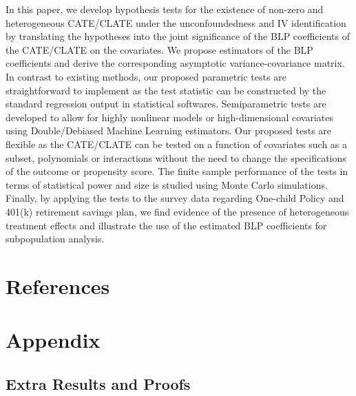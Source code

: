 \documentclass[
  12pt,
  12pt]{article}
\numberwithin{equation}{section}
\theoremstyle{definition}
\theoremstyle{plain}
\theoremstyle{plain}
\theoremstyle{remark}
\begin{document}
In this paper, we develop hypothesis tests for the existence of non-zero
and heterogeneous CATE/CLATE under the unconfoundedness and IV
identification by translating the hypotheses into the joint significance
of the BLP coefficients of the CATE/CLATE on the covariates. We propose
estimators of the BLP coefficients and derive the corresponding
asymptotic variance-covariance matrix. In contrast to existing methods,
our proposed parametric tests are straightforward to implement as the
test statistic can be constructed by the standard regression output in
statistical softwares. Semiparametric tests are developed to allow for
highly nonlinear models or high-dimensional covariates using
Double/Debiased Machine Learning estimators. Our proposed tests are
flexible as the CATE/CLATE can be tested on a function of covariates
such as a subset, polynomials or interactions without the need to change
the specifications of the outcome or propensity score. The finite sample
performance of the tests in terms of statistical power and size is
studied using Monte Carlo simulations. Finally, by applying the tests to
the survey data regarding One-child Policy and 401(k) retirement savings
plan, we find evidence of the presence of heterogeneous treatment
effects and illustrate the use of the estimated BLP coefficients for
subpopulation analysis.

\newpage

\section*{References}\label{references}

\renewcommand{\bibsection}{}


\newpage

\setcounter{section}{0}
\renewcommand{\thesection}{\Alph{section}}

\setcounter{table}{0}
\renewcommand{\thetable}{A\arabic{table}}

\setcounter{figure}{0}
\renewcommand{\thefigure}{A\arabic{figure}}

\section{Appendix}\label{appendix}

\subsection{Extra Results and Proofs}\label{sec-appenda}
\end{document}
